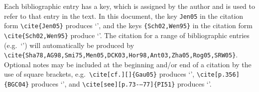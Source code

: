 \documentclass[]{interact}
\theoremstyle{plain}%
\theoremstyle{definition}
\theoremstyle{remark}
\begin{document}
Each bibliographic entry has a key, which is assigned by the author and is used to refer to that entry in the text. In this document, the key \verb"Jen05" in the citation form \verb"\cite{Jen05}" produces `\cite{Jen05}', and the keys \verb"{Sch02,Wen95}" in the citation form \verb"\cite{Sch02,Wen95}" produce `\cite{Sch02,Wen95}'. The citation for a range of bibliographic entries (e.g.\ `\cite{Sha78,AG98,Smi75,Men05,DCK03,Hor98,Ant03,Zha05,Rog05,SRW05}') will automatically be produced by  \verb"\cite{Sha78,AG98,Smi75,Men05,DCK03,Hor98,Ant03,Zha05,Rog05,SRW05}". Optional notes may be included at the beginning and/or end of a citation by the use of square brackets, e.g.\ \verb"\cite[cf.][]{Gau05}" produces `\cite[cf.][]{Gau05}', \verb"\cite[p.356]{BGC04}" produces `\cite[p.356]{BGC04}', and \verb"\cite[see][p.73-–77]{PI51}" produces `\cite[see][p.73--77]{PI51}'.
\end{document}
